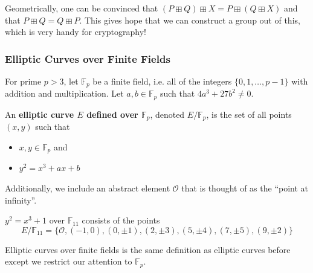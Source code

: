 Geometrically, one can be convinced that $(P \boxplus Q) \boxplus X = P \boxplus (Q\boxplus X)$ and that $P \boxplus Q = Q \boxplus P$. This gives hope that we can construct a group out of this, which is very handy for cryptography!

\subsubsection{Elliptic Curves over Finite Fields}

\begin{definition}
    For prime $p >3$, let $\mathbb{F}_p$ be a finite field, i.e. all of the integers $\{0, 1, \dots, p-1\}$ with addition and multiplication. Let $a, b \in \mathbb{F}_p$ such that $4a^3 + 27b^2 \neq 0$.
    
    An \textbf{elliptic curve $E$ defined over $\mathbb{F}_p$}, denoted $E / \mathbb{F}_p$, is the set of all points $(x,y)$ such that
    \begin{itemize}
        \item $x,y \in \mathbb{F}_p$ and
        \item $y^2 = x^3 + ax +b$
    \end{itemize}

    Additionally, we include an abstract element $\mathcal{O}$ that is thought of as the ``point at infinity''.
\end{definition}

\begin{example}
    $y^2 = x^3 + 1$ over $\mathbb{F}_{11}$ consists of the points
    $$E / \mathbb{F}_{11} = \{\mathcal{O}, (-1, 0), (0, \pm 1), (2, \pm 3), (5, \pm 4), (7, \pm 5), (9, \pm 2)\}$$
\end{example}

Elliptic curves over finite fields is the same definition as elliptic curves before except we restrict our attention to $\mathbb{F}_p$.

